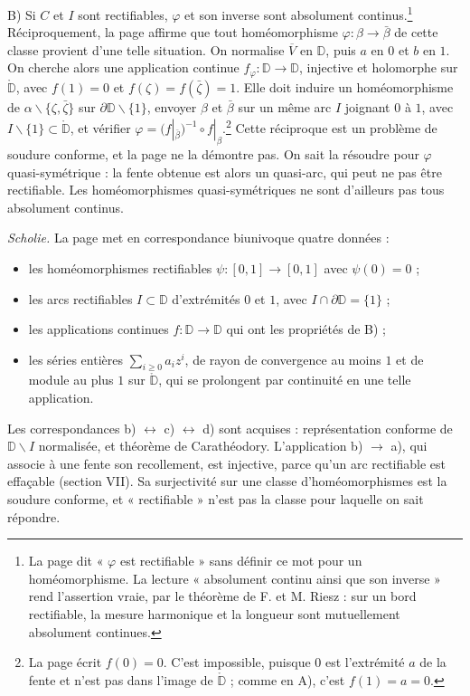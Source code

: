 \documentclass[11pt,a4paper]{article}
\begin{document}
B) Si $C$ et $I$ sont rectifiables, $\varphi$ et son inverse sont absolument
continus.\footnote{La page dit « $\varphi$ est rectifiable » sans définir
ce mot pour un homéomorphisme. La lecture « absolument continu ainsi que
son inverse » rend l'assertion vraie, par le théorème de F. et M. Riesz :
sur un bord rectifiable, la mesure harmonique et la longueur sont
mutuellement absolument continues.} Réciproquement, la page affirme que tout
homéomorphisme $\varphi : \beta \to \bar\beta$ de cette classe provient d'une
telle situation. On normalise $\overline{V}$ en $\mathbb{D}$, puis $a$ en $0$
et $b$ en $1$. On cherche alors une application continue $f_\varphi :
\mathbb{D} \to \mathbb{D}$, injective et holomorphe sur $\mathring{\mathbb{D}}$,
avec $f(1) = 0$ et $f(\zeta) = f(\bar\zeta) = 1$. Elle doit induire un
homéomorphisme de $\alpha \smallsetminus \{\zeta,\bar\zeta\}$ sur
$\partial\mathbb{D} \smallsetminus \{1\}$, envoyer $\beta$ et $\bar\beta$ sur
un même arc $I$ joignant $0$ à $1$, avec $I \smallsetminus \{1\} \subset
\mathring{\mathbb{D}}$, et vérifier $\varphi = (f|_{\bar\beta})^{-1} \circ
f|_{\beta}$.\footnote{La page écrit $f(0) = 0$. C'est impossible, puisque $0$
est l'extrémité $a$ de la fente et n'est pas dans l'image de
$\mathring{\mathbb{D}}$ ; comme en A), c'est $f(1) = a = 0$.} Cette
réciproque est un problème de soudure conforme, et la page ne la démontre
pas. On sait la résoudre pour $\varphi$ quasi-symétrique : la fente obtenue
est alors un quasi-arc, qui peut ne pas être rectifiable. Les homéomorphismes
quasi-symétriques ne sont d'ailleurs pas tous absolument continus.

\emph{Scholie.} La page met en correspondance biunivoque quatre données :
\begin{itemize}
  \item[a)] les homéomorphismes rectifiables $\psi : [0,1] \to [0,1]$ avec
  $\psi(0) = 0$ ;
  \item[b)] les arcs rectifiables $I \subset \mathbb{D}$ d'extrémités $0$ et
  $1$, avec $I \cap \partial\mathbb{D} = \{1\}$ ;
  \item[c)] les applications continues $f : \mathbb{D} \to \mathbb{D}$ qui ont
  les propriétés de B) ;
  \item[d)] les séries entières $\sum_{i \geqslant 0} a_i z^{i}$, de rayon de
  convergence au moins $1$ et de module au plus $1$ sur
  $\mathring{\mathbb{D}}$, qui se prolongent par continuité en une telle
  application.
\end{itemize}
Les correspondances b) $\leftrightarrow$ c) $\leftrightarrow$ d) sont
acquises : représentation conforme de $\mathbb{D} \smallsetminus I$
normalisée, et théorème de Carathéodory. L'application b) $\to$ a), qui
associe à une fente son recollement, est injective, parce qu'un arc
rectifiable est effaçable (section VII). Sa surjectivité sur une classe
d'homéomorphismes est la soudure conforme, et « rectifiable » n'est pas la
classe pour laquelle on sait répondre.
\end{document}
